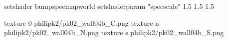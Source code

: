setshader bumpspecmapworld
setshaderparam "specscale" 1.5 1.5 1.5

texture 0 philipk2/pk02_wall04b_C.png
texture n philipk2/pk02_wall04b_N.png
texture s philipk2/pk02_wall04b_S.png


